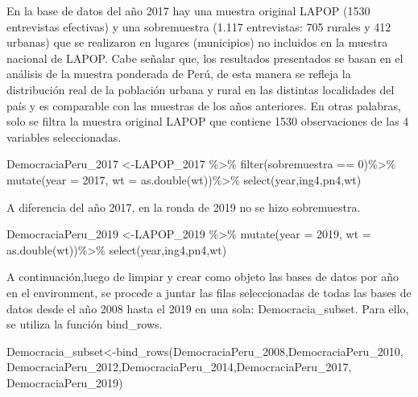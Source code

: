 \documentclass[
]{book}
\newenvironment{Shaded}{\begin{snugshade}}{\end{snugshade}}
\newcommand{\AttributeTok}[1]{\textcolor[rgb]{0.77,0.63,0.00}{#1}}
\newcommand{\DecValTok}[1]{\textcolor[rgb]{0.00,0.00,0.81}{#1}}
\newcommand{\FunctionTok}[1]{\textcolor[rgb]{0.00,0.00,0.00}{#1}}
\newcommand{\NormalTok}[1]{#1}
\newcommand{\OtherTok}[1]{\textcolor[rgb]{0.56,0.35,0.01}{#1}}
\newcommand{\SpecialCharTok}[1]{\textcolor[rgb]{0.00,0.00,0.00}{#1}}
\begin{document}
En la base de datos del año 2017 hay una muestra original LAPOP (1530 entrevistas efectivas) y una sobremuestra (1.117 entrevistas: 705 rurales y 412 urbanas) que se realizaron en lugares (municipios) no incluidos en la muestra nacional de LAPOP. Cabe señalar que, los resultados presentados se basan en el análisis de la muestra ponderada de Perú, de esta manera se refleja la distribución real de la población urbana y rural en las distintas localidades del país y es comparable con las muestras de los años anteriores. En otras palabras, solo se filtra la muestra original LAPOP que contiene 1530 observaciones de las 4 variables seleccionadas.

\begin{Shaded}
\begin{Highlighting}[]
\NormalTok{DemocraciaPeru\_2017 }\OtherTok{\textless{}{-}}\NormalTok{LAPOP\_2017 }\SpecialCharTok{\%\textgreater{}\%}
  \FunctionTok{filter}\NormalTok{(sobremuestra }\SpecialCharTok{==} \DecValTok{0}\NormalTok{)}\SpecialCharTok{\%\textgreater{}\%}
  \FunctionTok{mutate}\NormalTok{(}\AttributeTok{year =} \DecValTok{2017}\NormalTok{, }\AttributeTok{wt =} \FunctionTok{as.double}\NormalTok{(wt))}\SpecialCharTok{\%\textgreater{}\%}
  \FunctionTok{select}\NormalTok{(year,ing4,pn4,wt)}
\end{Highlighting}
\end{Shaded}

A diferencia del año 2017, en la ronda de 2019 no se hizo sobremuestra.

\begin{Shaded}
\begin{Highlighting}[]
\NormalTok{DemocraciaPeru\_2019 }\OtherTok{\textless{}{-}}\NormalTok{LAPOP\_2019 }\SpecialCharTok{\%\textgreater{}\%}
  \FunctionTok{mutate}\NormalTok{(}\AttributeTok{year =} \DecValTok{2019}\NormalTok{, }\AttributeTok{wt =} \FunctionTok{as.double}\NormalTok{(wt))}\SpecialCharTok{\%\textgreater{}\%}
  \FunctionTok{select}\NormalTok{(year,ing4,pn4,wt)}
\end{Highlighting}
\end{Shaded}

A continuación,luego de limpiar y crear como objeto las bases de datos por año en el environment, se procede a juntar las filas seleccionadas de todas las bases de datos desde el año 2008 hasta el 2019 en una sola: Democracia\_subset. Para ello, se utiliza la función bind\_rows.

\begin{Shaded}
\begin{Highlighting}[]
\NormalTok{Democracia\_subset}\OtherTok{\textless{}{-}}\FunctionTok{bind\_rows}\NormalTok{(DemocraciaPeru\_2008,DemocraciaPeru\_2010,}
\NormalTok{                             DemocraciaPeru\_2012,DemocraciaPeru\_2014,DemocraciaPeru\_2017,}
\NormalTok{                             DemocraciaPeru\_2019)}
\end{Highlighting}
\end{Shaded}
\end{document}
